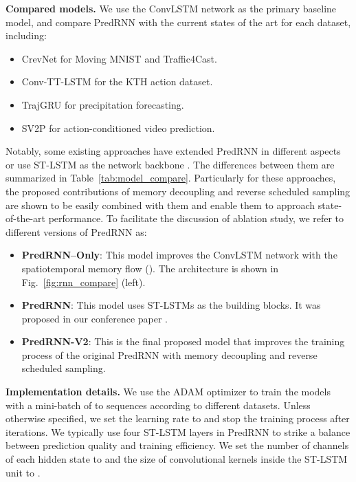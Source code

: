 \documentclass[10pt,journal,compsoc]{IEEEtran}
\newcommand{\tab}[1]{Table~\ref{#1}}
\newcommand{\fig}[1]{Fig.~\ref{#1}}
\newcommand{\myparagraph}[1]{\vspace{5pt} \noindent \textbf{#1.}}
\begin{document}
\myparagraph{Compared models} 
We use the ConvLSTM network \cite{shi2015convolutional} as the primary baseline model, and compare PredRNN with the current states of the art for each dataset, including: 
\begin{itemize}[leftmargin=*]
    \item CrevNet \cite{yu2020efficient} for Moving MNIST and Traffic4Cast.
    \item Conv-TT-LSTM \cite{su2020convolutional} for the KTH action dataset.
    \item TrajGRU \cite{shi2017deep} for precipitation forecasting.
    \item SV2P \cite{babaeizadeh2017stochastic} for action-conditioned video prediction.
\end{itemize}
Notably, some existing approaches have extended PredRNN in different aspects \cite{wang2018predrnn++,wang2019eidetic} or use ST-LSTM as the network backbone \cite{yu2020efficient}.
The differences between them are summarized in \tab{tab:model_compare}. Particularly for these approaches, the proposed contributions of memory decoupling and reverse scheduled sampling are shown to be easily combined with them and enable them to approach state-of-the-art performance.
To facilitate the discussion of ablation study, we refer to different versions of PredRNN as:
\begin{itemize}[leftmargin=*]
    \item \textbf{PredRNN--Only}: This model improves the ConvLSTM network with the spatiotemporal memory flow (). The architecture is shown in \fig{fig:rnn_compare} (left).
    \item \textbf{PredRNN}: This model uses ST-LSTMs as the building blocks. It was proposed in our conference paper \cite{wang2017predrnn}.
    \item \textbf{PredRNN-V2}: This is the final proposed model that improves the training process of the original PredRNN with memory decoupling and reverse scheduled sampling.
\end{itemize}

\myparagraph{Implementation details} 
We use the ADAM optimizer \cite{Kingma2014Adam} to train the models with a mini-batch of  to  sequences according to different datasets. 
Unless otherwise specified, we set the learning rate to  and stop the training process after  iterations.
We typically use four ST-LSTM layers in PredRNN to strike a balance between prediction quality and training efficiency. We set the number of channels of each hidden state to  and the size of convolutional kernels inside the ST-LSTM unit to .
\end{document}
